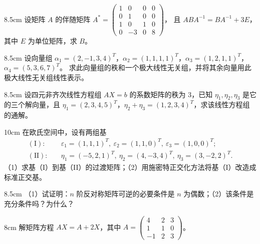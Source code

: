 
\begin{problem}{}{8.5cm}
设矩阵 $A$ 的伴随矩阵
$A^{*}=\begin{pmatrix}1&0&0&0\\0&1&0&0\\1&0&1&0\\0&-3&0&8\end{pmatrix}$，
且 $ABA^{-1}=BA^{-1}+3E$，其中 $E$ 为单位矩阵，求 $B$。
\end{problem}

\begin{problem}{}{8.5cm}
设向量组 $\alpha_1=(2,-1,3,4)^{T}$，$\alpha_2=(1,1,1,1)^{T}$，$\alpha_3=(1,2,1,1)^{T}$，$\alpha_4=(5,3,6,7)^{T}$。
求此向量组的秩和一个极大线性无关组，并将其余向量用此极大线性无关组线性表示。
\end{problem}

\begin{problem}{}{8.5cm}
设四元非齐次线性方程组 $AX=b$ 的系数矩阵的秩为 $3$，已知 $\eta_1,\eta_2,\eta_3$ 是它的三个解向量，且
$\eta_1=(2,3,4,5)^{T}$，$\eta_2+\eta_3=(1,2,3,4)^{T}$，求该线性方程组的通解。
\end{problem}

\begin{problem}{}{10cm}
在欧氏空间中，设有两组基
\begin{align*}
(\mathrm{I}):\quad & \varepsilon_1=(1,1,1)^{T},\ \varepsilon_2=(1,1,0)^{T},\ \varepsilon_3=(1,0,0)^{T};\\
(\mathrm{II}):\quad & \eta_1=(-5,2,1)^{T},\ \eta_2=(4,-3,4)^{T},\ \eta_3=(3,-2,2)^{T}.
\end{align*}
（1）求基（I）到基（II）的过渡矩阵；\quad（2）用施密特正交化方法将基（I）改造成标准正交基。
\end{problem}

\begin{problem}{}{8.5cm}
（1）试证明：$n$ 阶反对称矩阵可逆的必要条件是 $n$ 为偶数；\quad（2）该条件是充分条件吗？为什么？
\end{problem}

\begin{problem}{}{8cm}
解矩阵方程 $AX=A+2X$，其中
$A=\begin{pmatrix}4&2&3\\1&1&0\\-1&2&3\end{pmatrix}$。
\end{problem}


